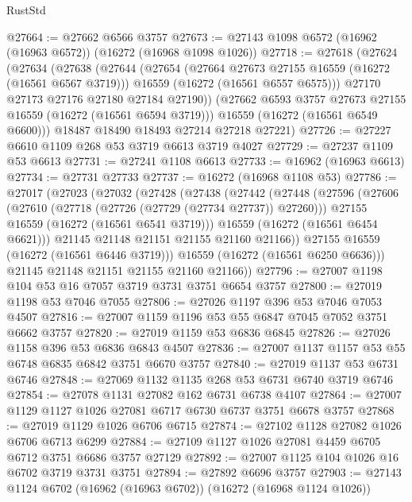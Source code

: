 \begin{lexlean}{RustStd}
\begin{coremodule}
@27664 := @27662 @6566 @3757
@27673 := @27143 @1098 @6572 (@16962 (@16963 @6572)) (@16272 (@16968 @1098 @1026))
@27718 := @27618
    (@27624
      (@27634
        (@27638
          (@27644
            (@27654
              (@27664 @27673 @27155 @16559 (@16272 (@16561 @6567 @3719)))
              @16559
              (@16272 (@16561 @6557 @6575)))
            @27170
            @27173
            @27176
            @27180
            @27184
            @27190))
        (@27662 @6593 @3757 @27673 @27155 @16559 (@16272 (@16561 @6594 @3719)))
        @16559
        (@16272 (@16561 @6549 @6600)))
      @18487
      @18490
      @18493
      @27214
      @27218
      @27221)
@27726 := @27227 @6610 @1109 @268 @53 @3719 @6613 @3719 @4027
@27729 := @27237 @1109 @53 @6613
@27731 := @27241 @1108 @6613
@27733 := @16962 (@16963 @6613)
@27734 := @27731 @27733
@27737 := @16272 (@16968 @1108 @53)
@27786 := @27017
    (@27023
      (@27032
        (@27428
          (@27438
            (@27442
              (@27448
                (@27596
                  (@27606
                    (@27610 (@27718 (@27726 (@27729 (@27734 @27737)) @27260)))
                    @27155
                    @16559
                    (@16272 (@16561 @6541 @3719)))
                  @16559
                  (@16272 (@16561 @6454 @6621)))
                @21145
                @21148
                @21151
                @21155
                @21160
                @21166))
            @27155
            @16559
            (@16272 (@16561 @6446 @3719)))
          @16559
          (@16272 (@16561 @6250 @6636)))
        @21145
        @21148
        @21151
        @21155
        @21160
        @21166))
@27796 := @27007 @1198 @104 @53 @16 @7057 @3719 @3731 @3751 @6654 @3757
@27800 := @27019 @1198 @53 @7046 @7055
@27806 := @27026 @1197 @396 @53 @7046 @7053 @4507
@27816 := @27007 @1159 @1196 @53 @55 @6847 @7045 @7052 @3751 @6662 @3757
@27820 := @27019 @1159 @53 @6836 @6845
@27826 := @27026 @1158 @396 @53 @6836 @6843 @4507
@27836 := @27007 @1137 @1157 @53 @55 @6748 @6835 @6842 @3751 @6670 @3757
@27840 := @27019 @1137 @53 @6731 @6746
@27848 := @27069 @1132 @1135 @268 @53 @6731 @6740 @3719 @6746
@27854 := @27078 @1131 @27082 @162 @6731 @6738 @4107
@27864 := @27007 @1129 @1127 @1026 @27081 @6717 @6730 @6737 @3751 @6678 @3757
@27868 := @27019 @1129 @1026 @6706 @6715
@27874 := @27102 @1128 @27082 @1026 @6706 @6713 @6299
@27884 := @27109 @1127 @1026 @27081 @4459 @6705 @6712 @3751 @6686 @3757 @27129
@27892 := @27007 @1125 @104 @1026 @16 @6702 @3719 @3731 @3751
@27894 := @27892 @6696 @3757
@27903 := @27143 @1124 @6702 (@16962 (@16963 @6702)) (@16272 (@16968 @1124 @1026))

\end{coremodule}
\end{lexlean}
